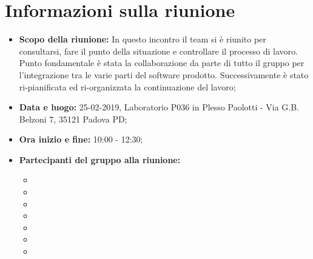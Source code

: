 \clearpage
\section{Informazioni sulla riunione}
\begin{itemize}
	\item \textbf {Scopo della riunione:} In questo incontro il team si è riunito per consultarsi, fare il punto della situazione e controllare il processo di lavoro. Punto fondamentale è stata la collaborazione da parte di tutto il gruppo per l'integrazione tra le varie parti del software prodotto. Successivamente è stato ri-pianificata ed ri-organizzata la continuazione del lavoro;
	\item \textbf {Data e luogo:} 25-02-2019, Laboratorio P036 in Plesso Paolotti - Via G.B. Belzoni 7, 35121 Padova PD;
	\item \textbf {Ora inizio e fine:} 10:00 - 12:30;
	\item \textbf {Partecipanti del gruppo alla riunione:} 
		 \begin{itemize}
			\item \sonia
			\item \pardeep
			\item \luca
			\item \matteo
			\item \alberto
			\item \alessandro
			\item \andrea
		\end{itemize}
\end{itemize}